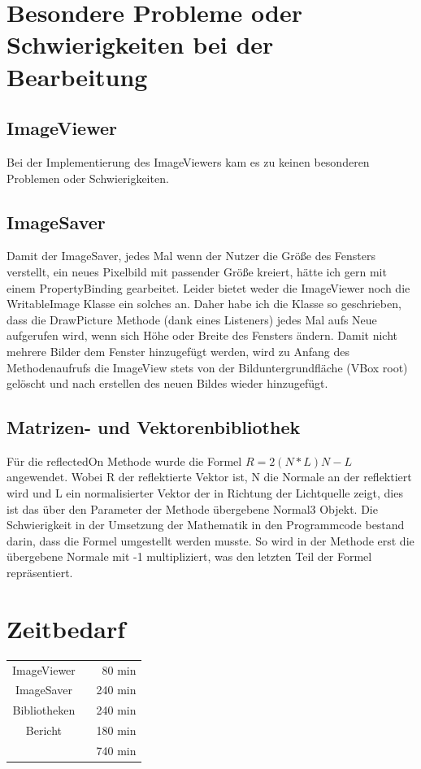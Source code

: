 \documentclass[14pt]{extarticle}
\begin{document}
\section{Besondere Probleme oder Schwierigkeiten bei der Bearbeitung}
\subsection{ImageViewer}
Bei der Implementierung des ImageViewers kam es zu keinen besonderen Problemen oder Schwierigkeiten.
\subsection{ImageSaver}
Damit der ImageSaver, jedes Mal wenn der Nutzer die Größe des Fensters verstellt, ein neues Pixelbild mit passender Größe kreiert, hätte ich gern mit einem PropertyBinding gearbeitet. 
Leider bietet weder die ImageViewer noch die WritableImage Klasse ein solches an. Daher habe ich die Klasse so geschrieben, dass die DrawPicture Methode (dank eines Listeners) jedes Mal aufs Neue aufgerufen wird, wenn sich Höhe oder Breite des Fensters ändern. 
\newline
Damit nicht mehrere Bilder dem Fenster hinzugefügt werden, wird zu Anfang des Methodenaufrufs die ImageView stets von der Bilduntergrundfläche (VBox root) gelöscht und nach erstellen des neuen Bildes wieder hinzugefügt. 
\subsection{Matrizen- und Vektorenbibliothek}
Für die reflectedOn Methode wurde die Formel 
\begin{math} R=2(N*L)N-L \end{math}
angewendet.  Wobei R der reflektierte Vektor ist, N die Normale an der reflektiert wird und L ein normalisierter Vektor der in Richtung der Lichtquelle zeigt, dies ist das über den Parameter der Methode übergebene Normal3 Objekt. Die Schwierigkeit in der Umsetzung der Mathematik in den Programmcode bestand darin, dass die Formel umgestellt werden musste. So wird in der Methode erst die übergebene Normale mit -1 multipliziert, was den letzten Teil der Formel repräsentiert. 

\section{Zeitbedarf}
\begin{center}
\begin{tabular}{cr}
ImageViewer	  \	&80 min	\\
ImageSaver 	\	&240 min	\\
Bibliotheken \	&240 min	\\
Bericht  \		&180 min	 \\
	\hline
	&740 min
\end{tabular}
\end{center}
\end{document}
